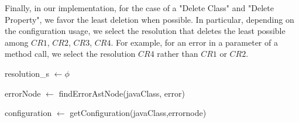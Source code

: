 %
Finally, in our implementation, for the case of a "Delete Class" and "Delete Property", we favor the least deletion when possible. In particular, depending on the configuration usage, we select the resolution that deletes the least possible among $CR1$, $CR2$, $CR3$, $CR4$. For example, for an error in a parameter of a method call, we select the resolution $CR4$ rather than $CR1$ or $CR2$. 

\begin{algorithm2e}[H]
	\footnotesize
	\SetAlgoLined
	
	resolution\_s $\leftarrow \phi$ 
	
		errorNode $\leftarrow$ findErrorAstNode(javaClass, error)
		
		configuration $\leftarrow$ getConfiguration(javaClass,errornode)
		
		
		{
			}
\end{algorithm2e}
